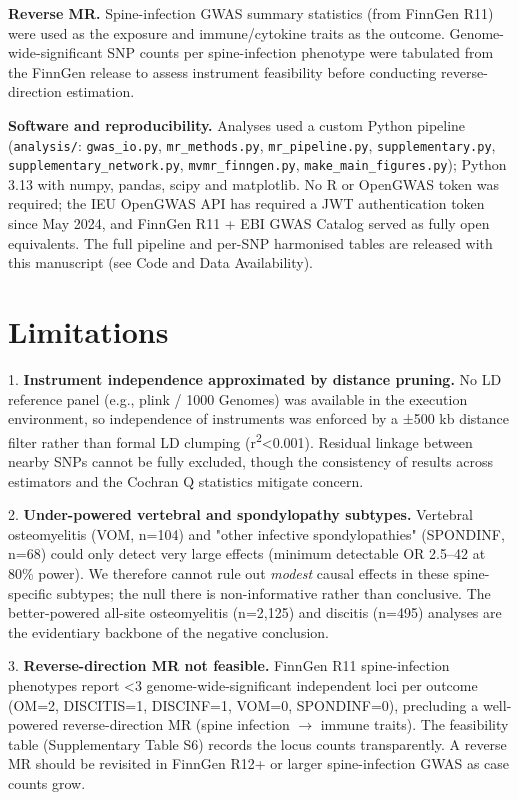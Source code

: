 \documentclass[11pt]{article}
\begin{document}
\textbf{Reverse MR.} Spine-infection GWAS summary statistics (from FinnGen R11) were used as the exposure and immune/cytokine traits as the outcome. Genome-wide-significant SNP counts per spine-infection phenotype were tabulated from the FinnGen release to assess instrument feasibility before conducting reverse-direction estimation.

\textbf{Software and reproducibility.} Analyses used a custom Python pipeline (\texttt{analysis/}: \texttt{gwas\_io.py}, \texttt{mr\_methods.py}, \texttt{mr\_pipeline.py}, \texttt{supplementary.py}, \texttt{supplementary\_network.py}, \texttt{mvmr\_finngen.py}, \texttt{make\_main\_figures.py}); Python 3.13 with numpy, pandas, scipy and matplotlib. No R or OpenGWAS token was required; the IEU OpenGWAS API has required a JWT authentication token since May 2024, and FinnGen R11 + EBI GWAS Catalog served as fully open equivalents. The full pipeline and per-SNP harmonised tables are released with this manuscript (see Code and Data Availability).

\section{Limitations}
1. \textbf{Instrument independence approximated by distance pruning.} No LD reference panel (e.g., plink / 1000 Genomes) was available in the execution environment, so independence of instruments was enforced by a ±500 kb distance filter rather than formal LD clumping (r\textsuperscript{2}<0.001). Residual linkage between nearby SNPs cannot be fully excluded, though the consistency of results across estimators and the Cochran Q statistics mitigate concern.

2. \textbf{Under-powered vertebral and spondylopathy subtypes.} Vertebral osteomyelitis (VOM, n=104) and "other infective spondylopathies" (SPONDINF, n=68) could only detect very large effects (minimum detectable OR 2.5--42 at 80\% power). We therefore cannot rule out \emph{modest} causal effects in these spine-specific subtypes; the null there is non-informative rather than conclusive. The better-powered all-site osteomyelitis (n=2,125) and discitis (n=495) analyses are the evidentiary backbone of the negative conclusion.

3. \textbf{Reverse-direction MR not feasible.} FinnGen R11 spine-infection phenotypes report <3 genome-wide-significant independent loci per outcome (OM=2, DISCITIS=1, DISCINF=1, VOM=0, SPONDINF=0), precluding a well-powered reverse-direction MR (spine infection $\rightarrow$  immune traits). The feasibility table (Supplementary Table S6) records the locus counts transparently. A reverse MR should be revisited in FinnGen R12+ or larger spine-infection GWAS as case counts grow.
\end{document}
